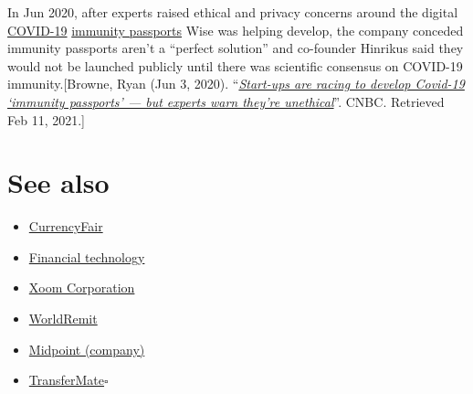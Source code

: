 \documentclass{book}
\numberwithin{equation}{section}
\begin{document}
%
In Jun 2020, after experts raised ethical and privacy concerns around the digital \href{https://en.wikipedia.org/wiki/COVID-19}{COVID-19} \href{https://en.wikipedia.org/wiki/Immunity_passport}{immunity passports} Wise was helping develop, the company conceded immunity passports aren't a ``perfect solution'' and co-founder Hinrikus said they would not be launched publicly until there was scientific consensus on COVID-19 immunity.[Browne, Ryan (Jun 3, 2020). ``\href{https://www.cnbc.com/2020/06/03/coronavirus-experts-warn-digital-immunity-passports-are-unethical.html}{\textit{Start-ups are racing to develop Covid-19 `immunity passports' — but experts warn they're unethical}}''. CNBC. Retrieved Feb 11, 2021.]

\section{See also}
\begin{itemize}
    \item \href{https://en.wikipedia.org/wiki/CurrencyFair}{CurrencyFair}
    \item \href{https://en.wikipedia.org/wiki/Financial_technology}{Financial technology}
    \item \href{https://en.wikipedia.org/wiki/Xoom_Corporation}{Xoom Corporation}
    \item \href{https://en.wikipedia.org/wiki/WorldRemit}{WorldRemit}
    \item \href{https://en.wikipedia.org/wiki/Midpoint_(company)}{Midpoint (company)}
    \item \href{https://en.wikipedia.org/wiki/TransferMate}{TransferMate}\hfill$\square$
\end{itemize}


\printbibliography[heading=bibintoc]
\end{document}
